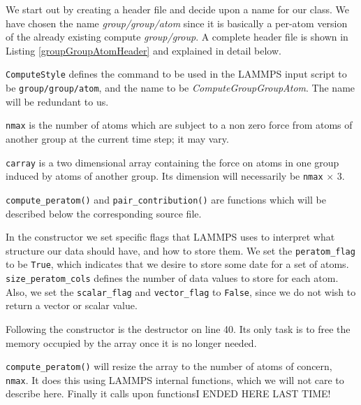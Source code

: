 \documentclass[twoside,english]{uiofysmaster}
\begin{document}
We start out by creating a header file and decide upon a name for our class. We have chosen the name \textit{group/group/atom} since it is basically a per-atom version of the already existing compute \textit{group/group}. A complete header file is shown in Listing \ref{groupGroupAtomHeader} and explained in detail below.



\texttt{ComputeStyle} defines the command to be used in the LAMMPS input script to be \texttt{group/group/atom}, and the name to be \textit{ComputeGroupGroupAtom}. The name will be redundant to us. 

\texttt{nmax} is the number of atoms which are subject to a non zero force from atoms of another group at the current time step; it may vary.

\texttt{carray} is a two dimensional array containing the force on atoms in one group induced by atoms of another group. Its dimension will necessarily be \texttt{nmax} $\times$ 3.

\texttt{compute\_peratom()} and \texttt{pair\_contribution()} are functions which will be described below the corresponding source file. 





In the constructor we set specific flags that LAMMPS uses to interpret what structure our data should have, and how to store them. We set the \texttt{peratom\_flag} to be \texttt{True}, which indicates that we desire to store some date for a set of atoms. \texttt{size\_peratom\_cols} defines the number of data values to store for each atom. Also, we set the \texttt{scalar\_flag} and \texttt{vector\_flag} to \texttt{False}, since we do not wish to return a vector or scalar value.

Following the constructor is the destructor on line 40. Its only task is to free the memory occupied by the array once it is no longer needed.  

\texttt{compute\_peratom()} will resize the array to the number of atoms of concern, \texttt{nmax}. It does this using LAMMPS internal functions, which we will not care to describe here. Finally it calls upon functions{\huge  I ENDED HERE LAST TIME!}
\end{document}
